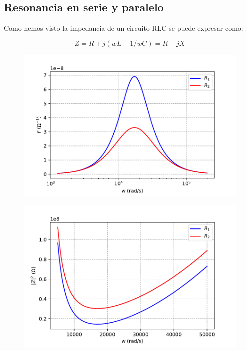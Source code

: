 \documentclass[12pt]{article}
\begin{document}
\subsection{Resonancia en serie y paralelo}

Como hemos visto la impedancia de un circuito RLC se puede expresar como:

\begin{equation}
Z = R + j (wL-1/wC) = R + j X
\end{equation}

\begin{figure}[h!] \centering
\includegraphics[scale=0.8]{amictancia.pdf}
\end{figure}

\begin{figure}[h!] \centering
\includegraphics[scale=0.8]{impedancia.pdf}
\end{figure}
\end{document}
